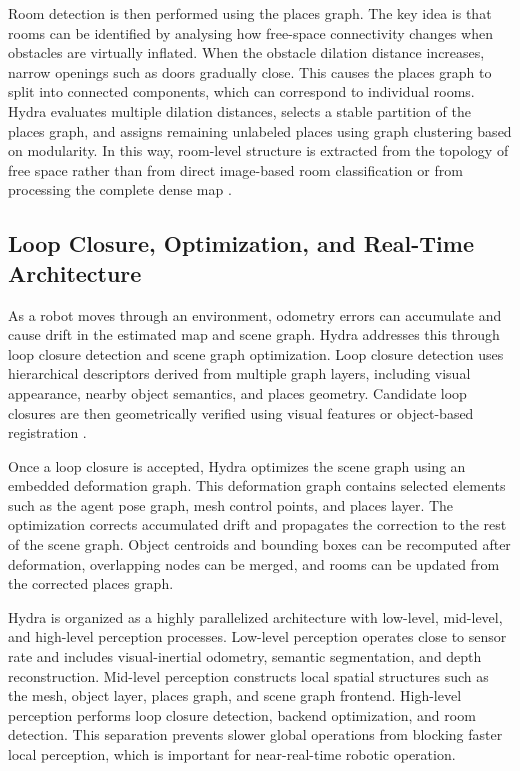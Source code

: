 {{{Room detection is then performed using the places graph. The key idea is that rooms can be identified by analysing how free-space connectivity changes when obstacles are virtually inflated. When the obstacle dilation distance increases, narrow openings such as doors gradually close. This causes the places graph to split into connected components, which can correspond to individual rooms. Hydra evaluates multiple dilation distances, selects a stable partition of the places graph, and assigns remaining unlabeled places using graph clustering based on modularity. In this way, room-level structure is extracted from the topology of free space rather than from direct image-based room classification or from processing the complete dense map \cite{hughes2022hydra}.

}


\subsection{Loop Closure, Optimization, and Real-Time Architecture}
\label{subsec:hydra_loop_closure}

{\small

As a robot moves through an environment, odometry errors can accumulate and cause drift in the estimated map and scene graph. Hydra addresses this through loop closure detection and scene graph optimization. Loop closure detection uses hierarchical descriptors derived from multiple graph layers, including visual appearance, nearby object semantics, and places geometry. Candidate loop closures are then geometrically verified using visual features or object-based registration \cite{hughes2022hydra}.

Once a loop closure is accepted, Hydra optimizes the scene graph using an embedded deformation graph. This deformation graph contains selected elements such as the agent pose graph, mesh control points, and places layer. The optimization corrects accumulated drift and propagates the correction to the rest of the scene graph. Object centroids and bounding boxes can be recomputed after deformation, overlapping nodes can be merged, and rooms can be updated from the corrected places graph.

Hydra is organized as a highly parallelized architecture with low-level, mid-level, and high-level perception processes. Low-level perception operates close to sensor rate and includes visual-inertial odometry, semantic segmentation, and depth reconstruction. Mid-level perception constructs local spatial structures such as the mesh, object layer, places graph, and scene graph frontend. High-level perception performs loop closure detection, backend optimization, and room detection. This separation prevents slower global operations from blocking faster local perception, which is important for near-real-time robotic operation.

}}}
